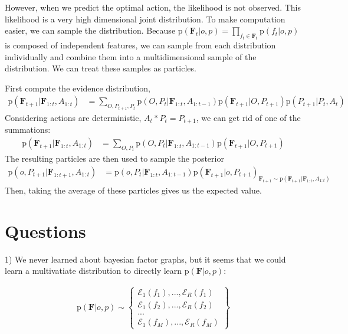 \documentclass[11pt]{article}
\newcommand{\SetOf}[1]{\mathbf{#1}} %
\newcommand{\prob}[1]{\text{p}(#1)} %
\newcommand{\Eq}[1]{\begin{align*}#1\end{align*}} %
\newcommand{\cursive}[1]{\mathcal{#1}}
\begin{document}
	However, when we predict the optimal action, the likelihood is not observed. This likelihood is a very high dimensional joint distribution. To make computation easier, we can sample the distribution. Because $\prob{\SetOf{F}_t|o,p} = \prod_{f_t \in \SetOf{F}_t} \prob{f_t|o,p}$ is composed of independent features, we can sample from each distribution individually and combine them into a multidimensional sample of the distribution. We can treat these samples as particles. 

	First compute the evidence distribution, 
	\Eq{\prob{\SetOf{F}_{t+1}|\SetOf{F}_{1:t},A_{1:t}} &= \sum_{O,P_{t+1},P_{t}}\prob{O,P_{t}|\SetOf{F}_{1:t},A_{1:t-1}}\prob{\SetOf{F}_{t+1}|O,P_{t+1}}\prob{P_{t+1}|P_t,A_t}}
	Considering actions are deterministic, $A_t*P_t=P_{t+1}$, we can get rid of one of the summations:
	\Eq{\prob{\SetOf{F}_{t+1}|\SetOf{F}_{1:t},A_{1:t}} &= \sum_{O,P_{t}}\prob{O,P_{t}|\SetOf{F}_{1:t},A_{1:t-1}}\prob{\SetOf{F}_{t+1}|O,P_{t+1}}}
	The resulting particles are then used to sample the posterior
	\Eq{\prob{o,P_{t+1}|\SetOf{F}_{1:t+1},A_{1:t}} &= \prob{o,P_t|\SetOf{F}_{1:t},A_{1:t-1}} \prob{\SetOf{F}_{t+1}|o,P_{t+1}}_{\SetOf{F}_{t+1} \sim \prob{\SetOf{F}_{t+1}|\SetOf{F}_{1:t},A_{1:t}}}}
	Then, taking the average of these particles gives us the expected value.


	


\section{Questions}
	1) We never learned about bayesian factor graphs, but it seems that we could learn a multivatiate distribution to directly learn $\prob{\SetOf{F}|o,p}$:

	\Eq{\prob{\SetOf{F}|o,p} \sim \left\{ \begin{array}{c} \cursive{E}_1(f_1), ...,  \cursive{E}_R(f_1)\\ \cursive{E}_1(f_2), ...,  \cursive{E}_R(f_2) \\ ... \\ \cursive{E}_1(f_M), ...,  \cursive{E}_R(f_M) \end{array}\right \}}

	\begin{center}
	\end{center}
\end{document}

